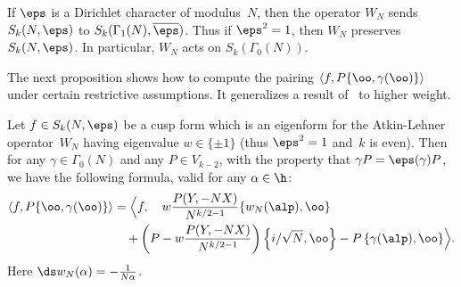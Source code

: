 If $\eps$ is a Dirichlet character of modulus~$N$, then
the operator $W_N$ sends $S_k(N,\eps)$ to
$S_k(\Gamma_1(N),\overline{\eps})$.  Thus if $\eps^2=1$,
then $W_N$ preserves $S_k(N,\eps)$.  In particular,
$W_N$ acts on $S_k(\Gamma_0(N))$. 

 
The next proposition shows how to compute the pairing
$\langle f, P\{\oo,\gamma(\oo)\} \rangle$ under
certain restrictive assumptions. 
It generalizes a result of~\cite{cremona:periods} to 
higher weight.  %

\begin{proposition}\label{wntrick}
Let $f \in S_k(N,\eps)$ be a cusp form which is
an eigenform for the Atkin-Lehner operator~$W_N$ 
having eigenvalue $w\in \{\pm 1\}$ (thus $\eps^2=1$ and~$k$ is even). 
Then for any $\gamma\in\Gamma_0(N)$ and any 
$P\in V_{k-2}$, with the property that $\gamma P = \eps(\gamma)P$, we have 
the following formula, valid for any $\alpha\in\h$:
\begin{align*}
\langle f, P\{\oo,\gamma(\oo)\}\rangle &= 
 \Bigl\langle f, \quad w \frac{P(Y,-NX)}{N^{k/2-1}}\{w_N(\alp),\oo\}\\
      &\quad +
   \left(P - w \frac{P(Y,-NX)}{N^{k/2-1}} \right)\left\{i/\sqrt{N},\oo\right\} 
        -P\left\{\gamma(\alp),\oo\right\} \Bigr\rangle.
\end{align*}
Here $\ds w_N(\alpha) = -\frac{1}{N\alpha}$. 
\end{proposition}
